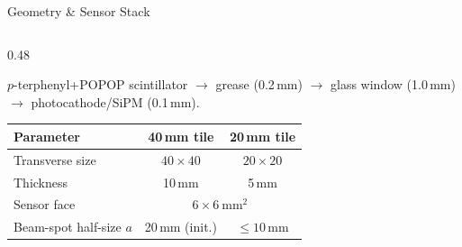 \documentclass[aspectratio=169,10pt]{beamer}
\begin{document}
\begin{frame}{Geometry \& Sensor Stack}
\begin{columns}[T]
\begin{column}{0.48\textwidth}
      \vspace{2pt}
      {\scriptsize\raggedright
      $p$-terphenyl+POPOP scintillator $\to$ grease (0.2\,mm) $\to$ glass
      window (1.0\,mm) $\to$ photocathode/SiPM (0.1\,mm).\par}

      \vspace{4pt}
      \scriptsize
      \begin{tabular}{lcc}
        \toprule
        Parameter & 40\,mm tile & 20\,mm tile \\
        \midrule
        Transverse size & $40\times40$ & $20\times20$ \\
        Thickness & 10\,mm & 5\,mm \\
        Sensor face & \multicolumn{2}{c}{$6\times6~\mathrm{mm^2}$} \\
        Beam-spot half-size $a$ & 20\,mm (init.) & $\le 10$\,mm \\
        \bottomrule
      \end{tabular}
    \end{column}
  \end{columns}
\end{frame}
\end{document}
